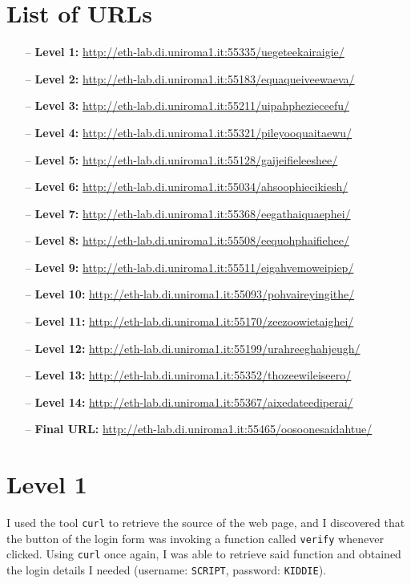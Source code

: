 \documentclass[12pt,a4paper]{article}
\begin{document}
	\section{List of URLs}
	\begin{itemize}
		\item[--] \textbf{Level 1: }\url{http://eth-lab.di.uniroma1.it:55335/uegeteekairaigie/}
		\item[--]\textbf{Level 2: }\url{http://eth-lab.di.uniroma1.it:55183/equaqueiveewaeva/}
		\item[--]\textbf{Level 3: }\url{http://eth-lab.di.uniroma1.it:55211/uipahphezieceefu/}
		\item[--]\textbf{Level 4: }\url{http://eth-lab.di.uniroma1.it:55321/pileyooquaitaewu/}
		\item[--]\textbf{Level 5: }\url{http://eth-lab.di.uniroma1.it:55128/gaijeifieleeshee/}
		\item[--]\textbf{Level 6: }\url{http://eth-lab.di.uniroma1.it:55034/ahsoophiecikiesh/}
		\item[--]\textbf{Level 7: }\url{http://eth-lab.di.uniroma1.it:55368/eegathaiquaephei/}
		\item[--]\textbf{Level 8: }\url{http://eth-lab.di.uniroma1.it:55508/eequohphaifiehee/}
		\item[--]\textbf{Level 9: }\url{http://eth-lab.di.uniroma1.it:55511/eigahvemoweipiep/}
		\item[--]\textbf{Level 10: }\url{http://eth-lab.di.uniroma1.it:55093/pohvaireyingithe/}
		\item[--]\textbf{Level 11: }\url{http://eth-lab.di.uniroma1.it:55170/zeezoowietaighei/}
		\item[--]\textbf{Level 12: }\url{http://eth-lab.di.uniroma1.it:55199/urahreeghahjeugh/}
		\item[--]\textbf{Level 13: }\url{http://eth-lab.di.uniroma1.it:55352/thozeewileiseero/}
		\item[--]\textbf{Level 14: }\url{http://eth-lab.di.uniroma1.it:55367/aixedateediperai/}
		\item[--] \textbf{Final URL: }\url{http://eth-lab.di.uniroma1.it:55465/oosoonesaidahtue/}
	\end{itemize}
	
	\newpage
	\section*{Level 1}
	I used the tool \texttt{curl} to retrieve the source of the web page, and I discovered that the button of the login form was invoking a function called \texttt{verify} whenever clicked. Using \texttt{curl} once again, I was able to retrieve said function and obtained the login details I needed (username: \texttt{SCRIPT}, password: \texttt{KIDDIE}).
\end{document}

